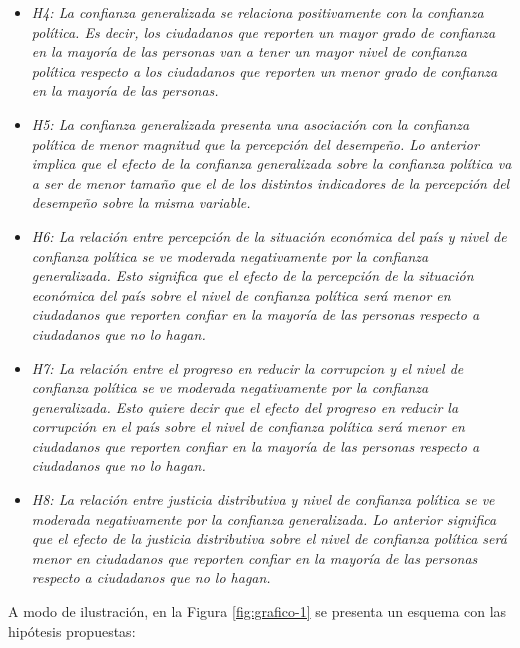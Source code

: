 \documentclass[12pt,twoside]{templates/facsothesis}
\begin{document}
\begin{itemize}
\item
  \emph{H4: La confianza generalizada se relaciona positivamente con la confianza política. Es decir, los ciudadanos que reporten un mayor grado de confianza en la mayoría de las personas van a tener un mayor nivel de confianza política respecto a los ciudadanos que reporten un menor grado de confianza en la mayoría de las personas.}
\item
  \emph{H5: La confianza generalizada presenta una asociación con la confianza política de menor magnitud que la percepción del desempeño. Lo anterior implica que el efecto de la confianza generalizada sobre la confianza política va a ser de menor tamaño que el de los distintos indicadores de la percepción del desempeño sobre la misma variable.}
\item
  \emph{H6: La relación entre percepción de la situación económica del país y nivel de confianza política se ve moderada negativamente por la confianza generalizada. Esto significa que el efecto de la percepción de la situación económica del país sobre el nivel de confianza política será menor en ciudadanos que reporten confiar en la mayoría de las personas respecto a ciudadanos que no lo hagan.}
\item
  \emph{H7: La relación entre el progreso en reducir la corrupcion y el nivel de confianza política se ve moderada negativamente por la confianza generalizada. Esto quiere decir que el efecto del progreso en reducir la corrupción en el país sobre el nivel de confianza política será menor en ciudadanos que reporten confiar en la mayoría de las personas respecto a ciudadanos que no lo hagan.}
\item
  \emph{H8: La relación entre justicia distributiva y nivel de confianza política se ve moderada negativamente por la confianza generalizada. Lo anterior significa que el efecto de la justicia distributiva sobre el nivel de confianza política será menor en ciudadanos que reporten confiar en la mayoría de las personas respecto a ciudadanos que no lo hagan.}
\end{itemize}

A modo de ilustración, en la Figura \ref{fig:grafico-1} se presenta un esquema con las hipótesis propuestas:
\end{document}
